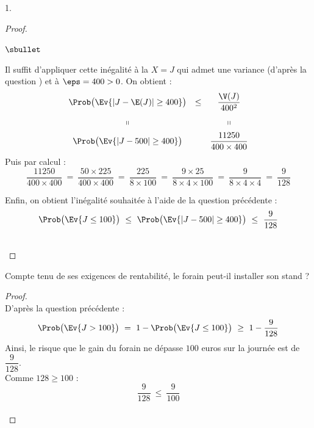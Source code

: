 \documentclass[11pt]{article}%
\begin{document}
\begin{noliste}{1.}
\begin{proof}
\begin{noliste}{$\sbullet$}
    \item Il suffit d'appliquer cette inégalité à la \var $X = J$ qui
      admet une variance (d'après la question ) et à $\eps =
      400 > 0$. On obtient :
      \[
      \begin{array}{cccc}
        \Prob\big( \Ev{|J - \E(J)| \geq 400} \big) & \leq &
        \dfrac{\V(J)}{400^2} 
        \\[.4cm]
        \shortparallel & & \shortparallel
        \\[.2cm]
        \Prob\big( \Ev{|J - 500| \geq 400} \big) & &
        \dfrac{11250}{400 \times 400}        
      \end{array}        
      \]
      Puis par calcul :
      \[
      \dfrac{11250}{400 \times 400} \ = \ \dfrac{50 \times 225}{400
        \times 400} \ = \ \dfrac{225}{8\times 100} \ = \ \dfrac{9
        \times 25}{8\times 4 \times 100} \ = \ \dfrac{9}{8\times 4
        \times 4} \ = \ \dfrac{9}{128}
      \]

    \item Enfin, on obtient l'inégalité souhaitée à l'aide de la
      question précédente :
      \[
      \Prob\big(\Ev{ J \leq 100}\big) \ \leq \ \Prob\big( \Ev{|J-500|\geq
        400} \big) \ \leq \ \dfrac{9}{128}
      \]
    \end{noliste}
    ~\\[-1cm]
  \end{proof}

\item Compte tenu de ses exigences de rentabilité, le forain peut-il
  installer son stand ?

  \begin{proof}~\\%
    D'après la question précédente :
    \[
    \Prob\big(\Ev{ J > 100}\big) \ = \ 1 - \Prob\big(\Ev{ J \leq
      100}\big) \ \geq \ 1 - \dfrac{9}{128}
    \]
    Ainsi, le risque que le gain du forain ne dépasse $100$ euros sur
    la journée est de $\dfrac{9}{128}$.\\
    Comme $128 \geq 100$ :
    \[
    \dfrac{9}{128} \ \leq \ \dfrac{9}{100}
    \]
    ~\\[-1cm]
  \end{proof}
\end{noliste}
\end{document}
